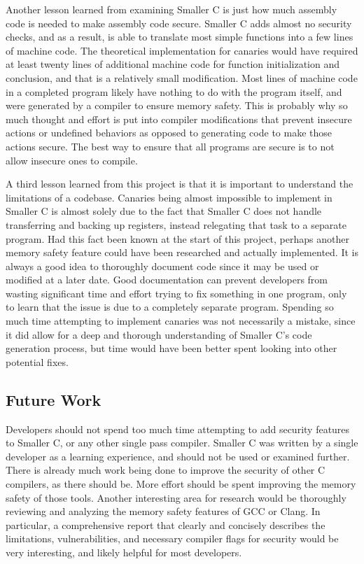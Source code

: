 \documentclass[sigconf, anonymous]{acmart}
\begin{document}
Another lesson learned from examining Smaller C is just how much assembly code is needed to make assembly code secure. Smaller C adds almost no security checks, and as a result, is able to translate most simple functions into a few lines of machine code. The theoretical implementation for canaries would have required at least twenty lines of additional machine code for function initialization and conclusion, and that is a relatively small modification. Most lines of machine code in a completed program likely have nothing to do with the program itself, and were generated by a compiler to ensure memory safety. This is probably why so much thought and effort is put into compiler modifications that prevent insecure actions or undefined behaviors as opposed to generating code to make those actions secure. The best way to ensure that all programs are secure is to not allow insecure ones to compile.

A third lesson learned from this project is that it is important to understand the limitations of a codebase. Canaries being almost impossible to implement in Smaller C is almost solely due to the fact that Smaller C does not handle transferring and backing up registers, instead relegating that task to a separate program. Had this fact been known at the start of this project, perhaps another memory safety feature could have been researched and actually implemented. It is always a good idea to thoroughly document code since it may be used or modified at a later date. Good documentation can prevent developers from wasting significant time and effort trying to fix something in one program, only to learn that the issue is due to a completely separate program. Spending so much time attempting to implement canaries was not necessarily a mistake, since it did allow for a deep and thorough understanding of Smaller C’s code generation process, but time would have been better spent looking into other potential fixes. 

\subsection{Future Work}

Developers should not spend too much time attempting to add security features to Smaller C, or any other single pass compiler. Smaller C was written by a single developer as a learning experience, and should not be used or examined further. There is already much work being done to improve the security of other C compilers, as there should be. More effort should be spent improving the memory safety of those tools. Another interesting area for research would be thoroughly reviewing and analyzing the memory safety features of GCC or Clang. In particular, a comprehensive report that clearly and concisely describes the limitations, vulnerabilities, and necessary compiler flags for security would be very interesting, and likely helpful for most developers. 
\end{document}
